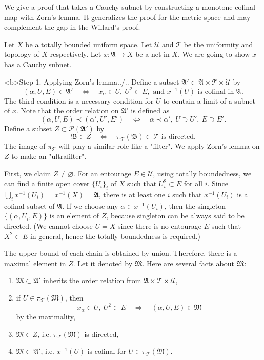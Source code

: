 \documentclass[11pt]{amsart}
\begin{document}
We give a proof that takes a Cauchy subnet by constructing a monotone cofinal map with Zorn's lemma.
It generalizes the proof for the metric space and may complement the gap in the Willard's proof.

\begin{pf}
Let $X$ be a totally bounded uniform space.
Let $\mathcal{U}$ and $\mathcal{T}$ be the uniformity and topology of $X$ respectively.
Let $x:\mathfrak{A}\to X$ be a net in $X$.
We are going to show $x$ has a Cauchy subnet.

<b>Step 1. Applying Zorn's lemma../..
Define a subset $\mathfrak{A}'\subset\mathfrak{A}\times\mathcal{T}\times\mathcal{U}$ by
\[(\alpha,U,E)\in\mathfrak{A}'\quad\Leftrightarrow\quad x_\alpha\in U,\ U^2\subset E,\text{ and }x^{-1}(U)\text{ is cofinal in }\mathfrak{A}.\]
The third condition is a necessary condition for $U$ to contain a limit of a subnet of $x$.
Note that the order relation on $\mathfrak{A}'$ is defined as
\[(\alpha,U,E)\prec(\alpha',U',E')\quad\Leftrightarrow\quad \alpha\prec\alpha',\ U\supset U',\ E\supset E'.\]
Define a subset $Z\subset\mathcal{P}(\mathfrak{A}')$ by
\[\mathfrak{B}\in Z\quad\Leftrightarrow\quad\pi_\mathcal{T}(\mathfrak{B})\subset\mathcal{T}\text{ is directed}.\]
The image of $\pi_\mathcal{T}$ will play a similar role like a "filter".
We apply Zorn's lemma on $Z$ to make an "ultrafilter".

First, we claim $Z\ne\varnothing$.
For an entourage $E\in\mathcal{U}$, using totally boundedness, we can find a finite open cover $\{U_i\}_i$ of $X$ such that $U_i^2\subset E$ for all $i$.
Since $\bigcup_ix^{-1}(U_i)=x^{-1}(X)=\mathfrak{A}$, there is at least one $i$ such that $x^{-1}(U_i)$ is a cofinal subset of $\mathfrak{A}$.
If we choose any $\alpha\in x^{-1}(U_i)$, then the singleton $\{(\alpha,U_i,E)\}$ is an element of $Z$, because singleton can be always said to be directed.
(We cannot choose $U=X$ since there is no entourage $E$ such that $X^2\subset E$ in general, hence the totally boundedness is required.)

The upper bound of each chain is obtained by union.
Therefore, there is a maximal element in $Z$.
Let it denoted by $\mathfrak{M}$.
Here are several facts about $\mathfrak{M}$:
\begin{enumerate}
\item $\mathfrak{M}\subset\mathfrak{A}'$ inherits the order relation from $\mathfrak{A}\times\mathcal{T}\times\mathcal{U}$,
\item if $U\in\pi_\mathcal{T}(\mathfrak{M})$, then \[x_\alpha\in U,\ U^2\subset E\quad\Rightarrow\quad(\alpha,U,E)\in\mathfrak{M}\] by the maximality,
\item $\mathfrak{M}\in Z$, i.e. $\pi_\mathcal{T}(\mathfrak{M})$ is directed,
\item $\mathfrak{M}\subset\mathfrak{A}'$, i.e. $x^{-1}(U)$ is cofinal for $U\in\pi_\mathcal{T}(\mathfrak{M})$.
\end{enumerate}


\end{pf}
\end{document}
